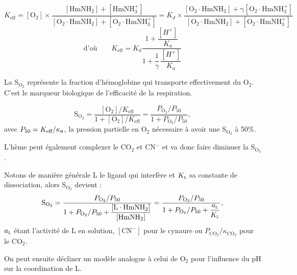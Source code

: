 \begin{solution}
\begin{questions}
    \question $K_\text{eff} = \mathrm{[O_2] \times \dfrac{[HmNH_2] + [HmNH_3^+]}{[O_2\cdot HmNH_2] + [O_2\cdot HmNH_3^+]}}
    = K_d \times \mathrm{\dfrac{[O_2\cdot HmNH_2] + \gamma [O_2\cdot HmNH_3^+]}{[O_2\cdot HmNH_2] + [O_2\cdot HmNH_3^+]}}$
    $$\text{d'où} \qquad K_\text{eff} = K_d \dfrac{1 + \dfrac{[H^+]}{K_a}}{1 + \dfrac{1}{\gamma}\,\dfrac{[H^+]}{K_a}}$$
    
    \question La S$_{\text{O}_2}$ représente la fraction d'hémoglobine qui transporte effectivement du O$_2$. C'est le marqueur biologique de l'efficacité de la respiration.
    
    \question $$\mathrm{S_{O_2}} = \dfrac{\mathrm{[O_2]}/K_\text{eff}}{1 + \mathrm{[O_2]}/K_\text{eff}} = \dfrac{P_{\text{O}_2}/P_{50}}{1 + P_{\text{O}_2}/P_{50}},$$
    avec $P_{50} = K_\text{eff} / \kappa_\textsc{h}$, la pression partielle en O$_2$ nécessaire à avoir une S$_{\text{O}_2}$ à 50\%.
    
    \question L'hème peut également complexer le CO$_2$ et CN$^-$ et va donc faire diminuer la S$_{\text{O}_2}$.
    
    Notons de manière générale L le ligand qui interfère et $K_\textsc{l}$ sa constante de dissociation, alors S$_{\text{O}_2}$ devient :
    $$\mathrm{S_{O_2}} = \dfrac{P_{\text{O}_2}/P_{50}}{1 + P_{\text{O}_2}/P_{50} + \mathrm{\dfrac{[L\cdot HmNH_2]}{[HmNH_2]}}} = \dfrac{P_{\text{O}_2}/P_{50}}{1 + P_{\text{O}_2}/P_{50} + \dfrac{a_\textsc{l}}{K_\textsc{l}}},$$
    $a_\textsc{l}$ étant l'activité de L en solution, $\mathrm{[CN^-]}$ pour le cynaure ou $P_\mathrm{CO_2}/\kappa_\mathrm{CO_2}$ pour le CO$_2$.
    
    On peut ensuite décliner un modèle analogue à celui de O$_2$ pour l'influence du pH sur la coordination de L.
\end{questions}
\end{solution}